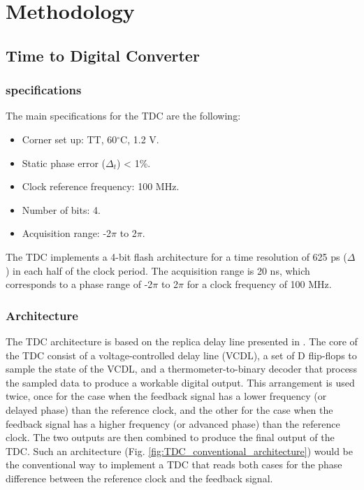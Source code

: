 \chapter{Methodology}
\section{Time to Digital Converter}

\subsection{specifications}
The main specifications for the TDC are the following:
\begin{itemize}
    \item Corner set up: TT, 60$^{\circ}$C, 1.2 V.
    \item Static phase error ($\Delta_t$) < 1\%.
    \item Clock reference frequency: 100 MHz.
    \item Number of bits: 4.
    \item Acquisition range: -2$\pi$ to 2$\pi$.
\end{itemize}

The TDC implements a 4-bit flash architecture for a time resolution of 625 ps ($\Delta$) in each half of the clock period. The acquisition range is 20 ns, which corresponds to a phase 
range of -2$\pi$ to 2$\pi$ for a clock frequency of 100 MHz.

\subsection{Architecture}
The TDC architecture is based on the replica delay line presented in \cite{Priyanka2015}. The core of the TDC consist of a voltage-controlled delay line (VCDL), a set of D flip-flops to sample the
state of the VCDL, and a thermometer-to-binary decoder that process the sampled data to produce a workable digital output. This arrangement is used twice, once for the case when the
feedback signal has a lower frequency (or delayed phase) than the reference clock, and the other for the case when the feedback signal has a higher frequency (or advanced phase) than
the reference clock. The two outputs are then combined to produce the final output of the TDC. Such an architecture (Fig. \ref{fig:TDC_conventional_architecture}) would be the 
conventional way to implement a TDC that reads both cases for the phase difference between the reference clock and the feedback signal. 

